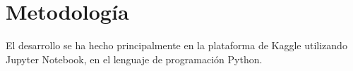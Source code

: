 \section{Metodología}
El desarrollo se ha hecho principalmente en la plataforma de Kaggle utilizando Jupyter Notebook, en el lenguaje de programación Python.

\bigskip

%
%
%






